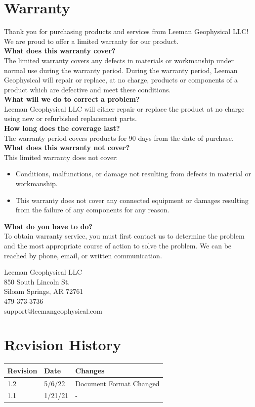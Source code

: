 \documentclass[letter,12pt,oneside,pdflatex,italian,final,twocolumn]{article}
\begin{document}
\newpage
\section{Warranty}
Thank you for purchasing products and services from Leeman Geophysical LLC! We are proud to offer a limited warranty for our product.\\

\noindent
\textbf{What does this warranty cover?}\\
\noindent
The limited warranty covers any defects in materials or workmanship under normal use during the warranty period. During the warranty
period, Leeman Geophysical will repair or replace, at no charge, products or components of a product which are defective and meet
these conditions. \\

\noindent
\textbf{What will we do to correct a problem?}\\
Leeman Geophysical LLC will either repair or replace the product at no charge using new or refurbished replacement parts.\\

\noindent
\textbf{How long does the coverage last?}\\
The warranty period covers products for 90 days from the date of purchase.\\

\noindent
\textbf{What does this warranty not cover?}\\
This limited warranty does not cover:
\begin{itemize}
\item Conditions, malfunctions, or damage not resulting from defects in material or workmanship.
\item This warranty does not cover any connected equipment or damages resulting from the failure of any components for any reason.\\
\end{itemize}

\noindent
\textbf{What do you have to do?}\\
To obtain warranty service, you must first contact us to determine the problem and the most appropriate course of action to solve the
problem. We can be reached by phone, email, or written communication.\\

\begin{centering}
Leeman Geophysical LLC\\
850 South Lincoln St.\\
Siloam Springs, AR 72761\\
479-373-3736\\
support@leemangeophysical.com\\
\end{centering}



\newpage

\section{Revision History}
\begin{table}[!htbp]
\begin{tabular}{|l|l|l|}
\hline
Revision & Date & Changes \\ \hline
1.2 & 5/6/22 & Document Format Changed \\ \hline
1.1 & 1/21/21 & - \\ \hline
\end{tabular}
\end{table}
\end{document}
